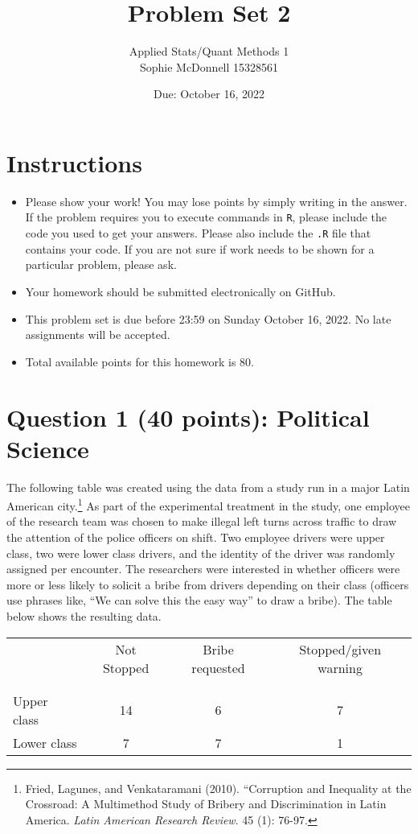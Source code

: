 \documentclass[12pt,letterpaper]{article}
\title{Problem Set 2}
\date{Due: October 16, 2022}
\author{Applied Stats/Quant Methods 1 \\
Sophie McDonnell 15328561
}
\begin{document}
	\maketitle
	\section*{Instructions}
\begin{itemize}
	\item Please show your work! You may lose points by simply writing in the answer. If the problem requires you to execute commands in \texttt{R}, please include the code you used to get your answers. Please also include the \texttt{.R} file that contains your code. If you are not sure if work needs to be shown for a particular problem, please ask.
	\item Your homework should be submitted electronically on GitHub.
	\item This problem set is due before 23:59 on Sunday October 16, 2022. No late assignments will be accepted.
	\item Total available points for this homework is 80.
\end{itemize}

	
	\vspace{.5cm}
	\section*{Question 1 (40 points): Political Science}
		\vspace{.25cm}
	The following table was created using the data from a study run in a major Latin American city.\footnote{Fried, Lagunes, and Venkataramani (2010). ``Corruption and Inequality at the Crossroad: A Multimethod Study of Bribery and Discrimination in Latin America. \textit{Latin American Research Review}. 45 (1): 76-97.} As part of the experimental treatment in the study, one employee of the research team was chosen to make illegal left turns across traffic to draw the attention of the police officers on shift. Two employee drivers were upper class, two were lower class drivers, and the identity of the driver was randomly assigned per encounter. The researchers were interested in whether officers were more or less likely to solicit a bribe from drivers depending on their class (officers use phrases like, ``We can solve this the easy way'' to draw a bribe). The table below shows the resulting data.

\newpage
\begin{table}[h!]
	\centering
	\begin{tabular}{l | c c c }
		& Not Stopped & Bribe requested & Stopped/given warning \\
		\\[-1.8ex] 
		\hline \\[-1.8ex]
		Upper class & 14 & 6 & 7 \\
		Lower class & 7 & 7 & 1 \\
		\hline
	\end{tabular}
\end{table}
\end{document}
